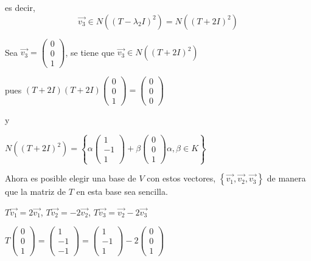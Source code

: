 \begin{example}
\noindent
es decir, 
$$\vec{v_3} \in N((T-\lambda_2 I )^2)=N((T+2 I )^2)$$

\bigskip

Sea $\vec{v_3}=\left(\begin{array}{c} 0 \\ 0
\\  1 \end{array}\right)$, se tiene que $ \vec{v_3} \in N((T+2 I )^2)$
 
pues 
$(T+2I)(T+2I)\left(\begin{array}{c} 0 \\ 0 
\\  1 \end{array}\right)=\left(\begin{array}{c} 0\\ 0
\\  0 \end{array}\right) $ 

y 

\bigskip

$N((T+2 I )^2)=\left\{\alpha   \left(\begin{array}{c} 1 \\ -1 
\\  1 \end{array}\right) + \beta  \left(\begin{array}{c} 0 \\ 0 
\\  1
\end{array} \right)    \alpha, \beta \in K    \right\}$

\bigskip

Ahora es posible  elegir una base de $V$ con estos vectores, $\left\{\vec{v_1},\vec{v_2},\vec{v_3}\right\}$  de manera que la matriz de $T$ en esta base sea sencilla.






\bigskip



$T \vec{v_1}=2\vec{v_1}$, $T \vec{v_2}=-2\vec{v_2}$, $T \vec{v_3}=\vec{v_2}-2\vec{v_3}$


\bigskip

$T \left(\begin{array}{c} 0 \\ 0 
\\  1 \end{array}\right)=\left(\begin{array}{c} 1 \\ -1
\\  -1 \end{array}\right) =\left(\begin{array}{c} 1 \\ -1
\\  1 \end{array}\right)-2 \left(\begin{array}{c} 0 \\ 0
\\  1 \end{array}\right)$


\end{example}
